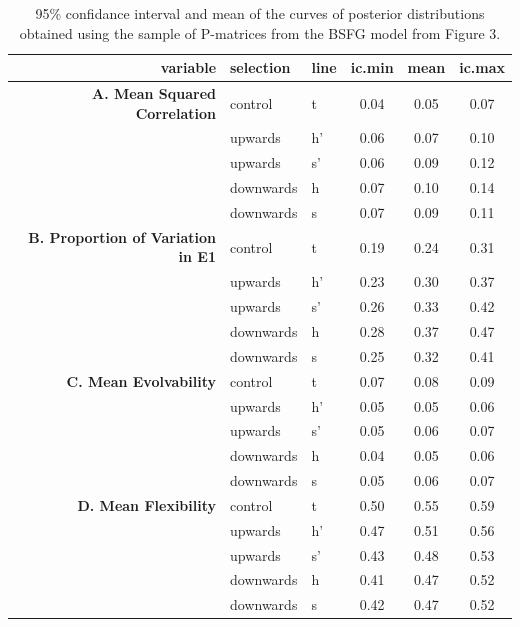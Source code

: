 \begin{refsection}
\begin{table}
\centering
\caption[Matrix statistics confidence intervals]{95\% confidance interval and mean of the curves of posterior distributions obtained using the sample of P-matrices from the BSFG model from Figure 3.}
\begin{tabular}{rllccc}
  \hline
variable & selection & line & ic.min & mean & ic.max \\
  \hline
\textbf{A. Mean Squared Correlation} & control & t & 0.04 & 0.05 & 0.07 \\
   & upwards & h' & 0.06 & 0.07 & 0.10 \\
   & upwards & s' & 0.06 & 0.09 & 0.12 \\
   & downwards & h & 0.07 & 0.10 & 0.14 \\
   & downwards & s & 0.07 & 0.09 & 0.11 \\
\textbf{B. Proportion of Variation in E1} & control & t & 0.19 & 0.24 & 0.31 \\
   & upwards & h' & 0.23 & 0.30 & 0.37 \\
   & upwards & s' & 0.26 & 0.33 & 0.42 \\
   & downwards & h & 0.28 & 0.37 & 0.47 \\
   & downwards & s & 0.25 & 0.32 & 0.41 \\
\textbf{C. Mean Evolvability} & control & t & 0.07 & 0.08 & 0.09 \\
   & upwards & h' & 0.05 & 0.05 & 0.06 \\
   & upwards & s' & 0.05 & 0.06 & 0.07 \\
   & downwards & h & 0.04 & 0.05 & 0.06 \\
   & downwards & s & 0.05 & 0.06 & 0.07 \\
\textbf{D. Mean Flexibility} & control & t & 0.50 & 0.55 & 0.59 \\
   & upwards & h' & 0.47 & 0.51 & 0.56 \\
   & upwards & s' & 0.43 & 0.48 & 0.53 \\
   & downwards & h & 0.41 & 0.47 & 0.52 \\
   & downwards & s & 0.42 & 0.47 & 0.52 \\
  

   \hline
\end{tabular}
\end{table}


\end{refsection}
